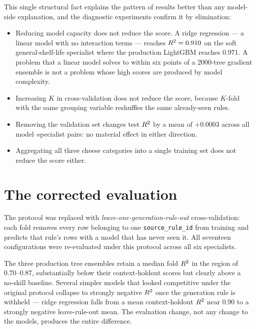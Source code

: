 This single structural fact explains the pattern of results better than
any model-side explanation, and the diagnostic experiments confirm it by
elimination:

\begin{itemize}[leftmargin=1.3em, itemsep=2pt]
\item Reducing model capacity does not reduce the score. A ridge
  regression --- a linear model with no interaction terms --- reaches
  $R^2 = 0.910$ on the soft general-shelf-life specialist where the
  production LightGBM reaches $0.971$. A problem that a linear model
  solves to within six points of a 2000-tree gradient ensemble is not a
  problem whose high scores are produced by model complexity.
\item Increasing $K$ in cross-validation does not reduce the score,
  because $K$-fold with the same grouping variable reshuffles the same
  already-seen rules.
\item Removing the validation set changes test $R^2$ by a mean of
  $+0.0003$ across all model--specialist pairs: no material effect in
  either direction.
\item Aggregating all three cheese categories into a single training set
  does not reduce the score either.
\end{itemize}

\section*{The corrected evaluation}

The protocol was replaced with \emph{leave-one-generation-rule-out}
cross-validation: each fold removes every row belonging to one
\texttt{source\_rule\_id} from training and predicts that rule's rows
with a model that has never seen it. All seventeen configurations were
re-evaluated under this protocol across all six specialists.

\begin{findingbox}[title=Effect of the protocol change]
The three production tree ensembles retain a median fold $R^2$ in the
region of $0.70$--$0.87$, substantially below their context-holdout
scores but clearly above a no-skill baseline. Several simpler models that
looked competitive under the original protocol collapse to strongly
negative $R^2$ once the generation rule is withheld --- ridge regression
falls from a mean context-holdout $R^2$ near $0.90$ to a strongly
negative leave-rule-out mean. The evaluation change, not any change to
the models, produces the entire difference.
\end{findingbox}

